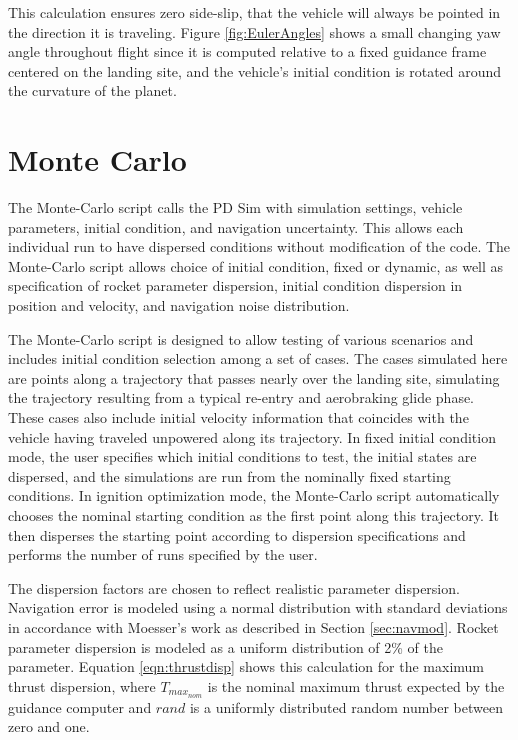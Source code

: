 This calculation ensures zero side-slip, that the vehicle will always be pointed in the direction it is traveling. Figure \ref{fig:EulerAngles} shows a small changing yaw angle throughout flight since it is computed relative to a fixed guidance frame centered on the landing site, and the vehicle's initial condition is rotated around the curvature of the planet. 

\section{Monte Carlo}
The Monte-Carlo script calls the PD Sim with simulation settings, vehicle parameters, initial condition, and navigation uncertainty. This allows each individual run to have dispersed conditions without modification of the code. The Monte-Carlo script allows choice of initial condition, fixed or dynamic, as well as specification of rocket parameter dispersion, initial condition dispersion in position and velocity, and navigation noise distribution.

The Monte-Carlo script is designed to allow testing of various scenarios and includes initial condition selection among a set of cases. The cases simulated here are points along a trajectory that passes nearly over the landing site, simulating the trajectory resulting from a typical re-entry and aerobraking glide phase. These cases also include initial velocity information that coincides with the vehicle having traveled unpowered along its trajectory. In fixed initial condition mode, the user specifies which initial conditions to test, the initial states are dispersed, and the simulations are run from the nominally fixed starting conditions. In ignition optimization mode, the Monte-Carlo script automatically chooses the nominal starting condition as the first point along this trajectory. It then disperses the starting point according to dispersion specifications and performs the number of runs specified by the user.

The dispersion factors are chosen to reflect realistic parameter dispersion. Navigation error is modeled using a normal distribution with standard deviations in accordance with Moesser's\:\cite{MOESSER} work as described in Section \ref{sec:navmod}. Rocket parameter dispersion is modeled as a uniform distribution of 2\% of the parameter. Equation \ref{eqn:thrustdisp} shows this calculation for the maximum thrust dispersion, where $T_{max_{nom}}$ is the nominal maximum thrust expected by the guidance computer and $rand$ is a uniformly distributed random number between zero and one.

